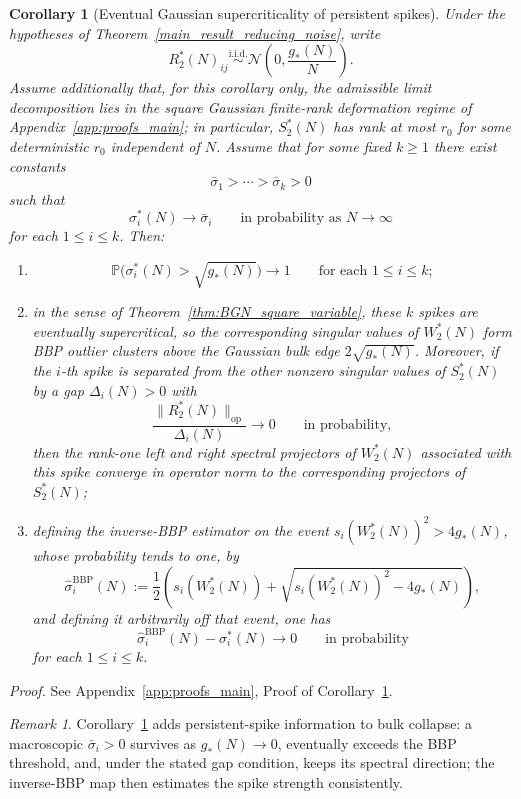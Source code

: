 \documentclass[11pt]{article}
\theoremstyle{plain}
\newtheorem{cor}[thm]{Corollary}
\theoremstyle{definition}
\theoremstyle{remark}
\newtheorem{rem}[thm]{Remark}
\newcommand{\PP}{\mathbb{P}}
\newcommand{\op}{\mathrm{op}}
\newcommand{\1}{\mathbf{1}}
\newcommand{\proofloc}[1]{\par\noindent\emph{Proof.} #1\par}
\begin{document}
\begin{cor}[Eventual Gaussian supercriticality of persistent spikes]
\label{cor:gaussian_BBP_persistent_spikes}
Under the hypotheses of Theorem~\ref{main_result_reducing_noise}, write
\[
R_2^*(N)_{ij}\overset{\mathrm{i.i.d.}}{\sim}
\mathcal N\!\left(0,\frac{g_*(N)}{N}\right).
\]
Assume additionally that, for this corollary only, the admissible limit decomposition lies in the square Gaussian finite-rank deformation regime of Appendix~\ref{app:proofs_main}; in particular, \(S_2^*(N)\) has rank at most \(r_0\) for some deterministic \(r_0\) independent of \(N\).
Assume that for some fixed \(k\ge1\) there exist constants
\[
\bar\sigma_1>\cdots>\bar\sigma_k>0
\]
such that
\[
\sigma_i^*(N)\to \bar\sigma_i
\qquad\text{in probability as }N\to\infty
\]
for each \(1\le i\le k\). Then:
\begin{enumerate}[leftmargin=2em]
\item
\[
\PP\!\big(\sigma_i^*(N)>\sqrt{g_*(N)}\big)\to1
\qquad\text{for each }1\le i\le k;
\]
\item in the sense of Theorem~\ref{thm:BGN_square_variable}, these \(k\) spikes are eventually supercritical, so the corresponding singular values of \(W_2^*(N)\) form BBP outlier clusters above the Gaussian bulk edge \(2\sqrt{g_*(N)}\). Moreover, if the \(i\)-th spike is separated from the other nonzero singular values of \(S_2^*(N)\) by a gap \(\Delta_i(N)>0\) with
\[
\frac{\|R_2^*(N)\|_{\op}}{\Delta_i(N)}\to0
\qquad\text{in probability},
\]
then the rank-one left and right spectral projectors of \(W_2^*(N)\) associated with this spike converge in operator norm to the corresponding projectors of \(S_2^*(N)\);
\item defining the inverse-BBP estimator on the event \(s_i(W_2^*(N))^2>4g_*(N)\), whose probability tends to one, by
\[
\widehat\sigma_i^{\mathrm{BBP}}(N)
:=
\frac12\left(
s_i(W_2^*(N))
+
\sqrt{s_i(W_2^*(N))^2-4g_*(N)}
\right),
\]
and defining it arbitrarily off that event,
one has
\[
\widehat\sigma_i^{\mathrm{BBP}}(N)-\sigma_i^*(N)\to0
\qquad\text{in probability}
\]
for each \(1\le i\le k\).
\end{enumerate}
\end{cor}
\proofloc{See Appendix~\ref{app:proofs_main}, Proof of Corollary~\ref{cor:gaussian_BBP_persistent_spikes}.}

\begin{rem}
Corollary~\ref{cor:gaussian_BBP_persistent_spikes} adds persistent-spike information to bulk collapse: a macroscopic \(\bar\sigma_i>0\) survives as \(g_*(N)\to0\), eventually exceeds the BBP threshold, and, under the stated gap condition, keeps its spectral direction; the inverse-BBP map then estimates the spike strength consistently.
\end{rem}
\end{document}
